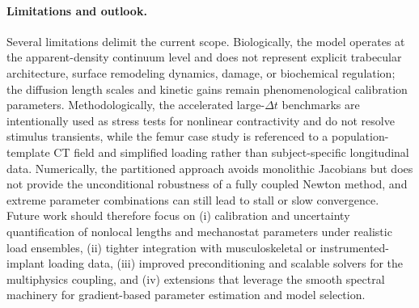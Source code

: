 \paragraph{Limitations and outlook.}
Several limitations delimit the current scope.
Biologically, the model operates at the apparent-density continuum level and does not represent explicit trabecular architecture, surface remodeling dynamics, damage, or biochemical regulation; the diffusion length scales and kinetic gains remain phenomenological calibration parameters.
Methodologically, the accelerated large-$\Delta t$ benchmarks are intentionally used as stress tests for nonlinear contractivity and do not resolve stimulus transients, while the femur case study is referenced to a population-template CT field and simplified loading rather than subject-specific longitudinal data.
Numerically, the partitioned approach avoids monolithic Jacobians but does not provide the unconditional robustness of a fully coupled Newton method, and extreme parameter combinations can still lead to stall or slow convergence.
Future work should therefore focus on (i) calibration and uncertainty quantification of nonlocal lengths and mechanostat parameters under realistic load ensembles, (ii) tighter integration with musculoskeletal or instrumented-implant loading data, (iii) improved preconditioning and scalable solvers for the multiphysics coupling, and (iv) extensions that leverage the smooth spectral machinery for gradient-based parameter estimation and model selection.

